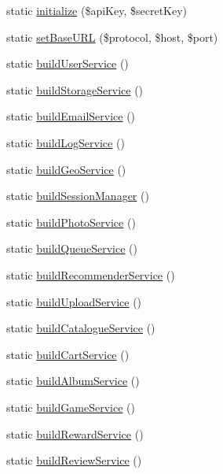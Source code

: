 \begin{DoxyCompactItemize}
\item 
static \hyperlink{class_app42_a_p_i_a6746bd75498ac8f9c3b887dc2c905955}{initialize} (\$api\+Key, \$secret\+Key)
\item 
static \hyperlink{class_app42_a_p_i_abc486eb56484dd5b029a188365a238c0}{set\+Base\+U\+R\+L} (\$protocol, \$host, \$port)
\item 
static \hyperlink{class_app42_a_p_i_a03eb8c62c6cc1592008921ac51778a53}{build\+User\+Service} ()
\item 
static \hyperlink{class_app42_a_p_i_a60b112cd01cb7fdae5905207cc06107f}{build\+Storage\+Service} ()
\item 
static \hyperlink{class_app42_a_p_i_a5126b6bae6f3af887d4cfbe8fe0c4144}{build\+Email\+Service} ()
\item 
static \hyperlink{class_app42_a_p_i_ac8bbad15248f3dd13c37b4e07c153b8e}{build\+Log\+Service} ()
\item 
static \hyperlink{class_app42_a_p_i_aeaae0fb673ca01b0d44440c9a273b1c5}{build\+Geo\+Service} ()
\item 
static \hyperlink{class_app42_a_p_i_aa4c9ed827be9f6e558f033b1537f4cd8}{build\+Session\+Manager} ()
\item 
static \hyperlink{class_app42_a_p_i_a1d68a3bc7d1822f620c68c4a08f56717}{build\+Photo\+Service} ()
\item 
static \hyperlink{class_app42_a_p_i_a18daf7cf04c8612891cbfef4d877bb95}{build\+Queue\+Service} ()
\item 
static \hyperlink{class_app42_a_p_i_a49d5c092023dffcc169feff1d46d2526}{build\+Recommender\+Service} ()
\item 
static \hyperlink{class_app42_a_p_i_ab84106b38356f943ad2eef8bd20c6b8a}{build\+Upload\+Service} ()
\item 
static \hyperlink{class_app42_a_p_i_a191e3897f250bac5351d9dad48942614}{build\+Catalogue\+Service} ()
\item 
static \hyperlink{class_app42_a_p_i_abbc549f395a746a3aa1fdcb57fa08b46}{build\+Cart\+Service} ()
\item 
static \hyperlink{class_app42_a_p_i_a5f9d77d27992ef0bfc3fb15005627962}{build\+Album\+Service} ()
\item 
static \hyperlink{class_app42_a_p_i_ab9278d743785f7f53a1000a3bfb03aee}{build\+Game\+Service} ()
\item 
static \hyperlink{class_app42_a_p_i_a17f0fce62d39ee64435254d7fe805835}{build\+Reward\+Service} ()
\item 
static \hyperlink{class_app42_a_p_i_a1877b325623dc0c31b4eba72b6e0f5f9}{build\+Review\+Service} ()

\end{DoxyCompactItemize}
